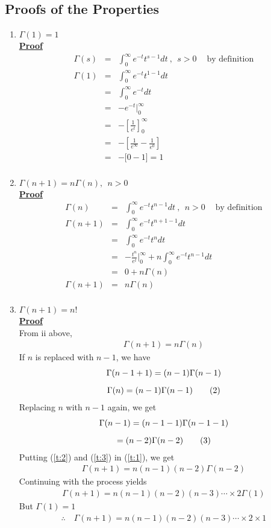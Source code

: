 \documentclass[11pt]{report}
\newcommand{\ubt}[1]{\textbf{\underline{#1}}}
\newcommand{\sps}{\\[0.2cm]}
\newcommand{\refn}[1]{(\ref{#1})}
\newcommand{\dsp}{\displaystyle}
\begin{document}
	\subsection{Proofs of the Properties}
	\begin{enumerate}
		\item $\dsp \Gamma(1) = 1$\\
			\ubt{Proof}
			\begin{eqnarray*}
				\Gamma(s) &=& \int_0^\infty e^{-t}t^{s-1}dt~,~~ s>0~~~~ \text{ by definition}\sps
				\Gamma(1) &=& \int_0^\infty e^{-t}t^{1-1}dt\sps
				&=& \int_0^\infty e^{-t}dt\sps
				&=& -e^{-t}\Big|_0^\infty\sps
				&=& -\left[\frac{1}{e^t}\right]_0^\infty\sps
				&=& -\left[\frac{1}{e^\infty} - \frac{1}{e^0}\right]\sps
				&=& - \Big[0-1\Big] = 1\sps
			\end{eqnarray*}
		
		\item $\dsp\Gamma(n+1) = n\Gamma(n), ~~ n>0$\\
			\ubt{Proof}
			\begin{eqnarray*}
				\Gamma(n) &=& \int_0^\infty e^{-t}t^{n-1}dt~,~~ n>0~~~~ \text{ by definition}\sps
				\Gamma(n+1) &=& \int_0^\infty e^{-t}t^{n+1-1}dt\sps
				&=& \int_0^\infty e^{-t}t^ndt\sps
				&=& -\frac{t^n}{e^t}\Bigg|_0^\infty + n\int_0^\infty e^{-t}t^{n-1}dt\sps
				&=& 0 + n\Gamma(n)\sps
				\Gamma(n+1) &=& n\Gamma(n)\sps
			\end{eqnarray*}
		
		\item $\dsp\Gamma(n+1) = n!$\\
			\ubt{Proof}\\
			From ii above,\\
			\begin{gather}
				\Gamma(n+1) = n\Gamma(n)\tag{1}\label{t:1}
			\end{gather}
			If $n$ is replaced with $n-1$, we have
			\begin{gather}
				\Gamma(n-1+1) = (n-1)\Gamma(n-1)\notag\sps
				\Gamma(n) = (n-1)\Gamma(n-1)\tag{2}\label{t:2}
			\end{gather}
			Replacing $n$ with $n-1$ again, we get
			\begin{gather}
				\Gamma(n-1) = (n-1-1)\Gamma(n-1-1)\notag\sps
				= (n-2)\Gamma(n-2)\tag{3}\label{t:3}
			\end{gather}
			Putting \refn{t:2} and \refn{t:3} in \refn{t:1}, we get
			\begin{gather}
				\Gamma(n+1)=n(n-1)(n-2)\Gamma(n-2)\tag{4}\label{t:4}
			\end{gather}
			Continuing with the process yields
			\begin{gather*}
				\Gamma(n+1) = n(n-1)(n-2)(n-3)\cdots\times 2\Gamma(1)
			\end{gather*}
			But $\Gamma(1)=1$
			\begin{gather*}
				\therefore \quad\Gamma(n+1) = n(n-1)(n-2)(n-3)\cdots\times 2 \times 1
			\end{gather*}
	\end{enumerate}
	
\end{document}
